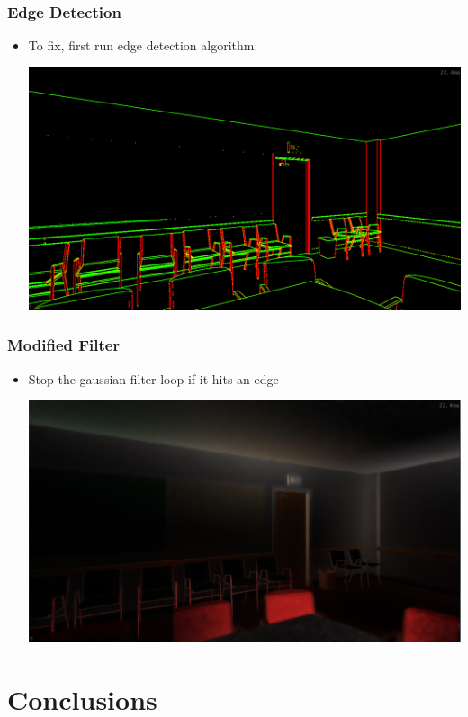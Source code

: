 \documentclass{beamer}
\begin{document}
\begin{frame}
\frametitle{Edge Detection}
\begin{itemize}
\item To fix, first run edge detection algorithm:
\begin{center}
\includegraphics[scale=0.3]{img/edge-tex}
\end{center}
\end{itemize}
\end{frame}

\begin{frame}
\frametitle{Modified Filter}
\begin{itemize}
\item Stop the gaussian filter loop if it hits an edge
\begin{center}
\includegraphics[scale=0.3]{img/w-edge-rad}
\end{center}
\end{itemize}
\end{frame}

\section{Conclusions}
\end{document}
